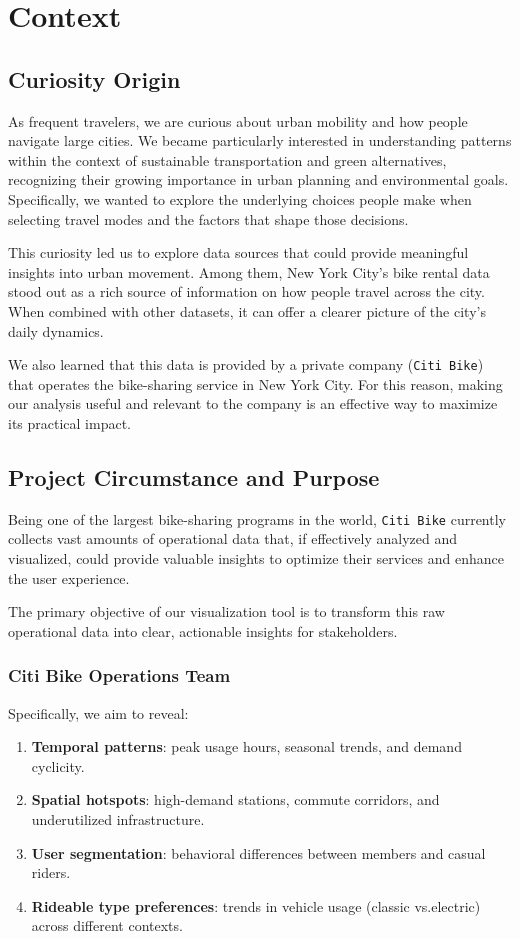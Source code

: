\section{Context}

\subsection{Curiosity Origin}
As frequent travelers, we are curious about urban mobility and how people navigate large cities.
We became particularly interested in understanding patterns within the context of sustainable transportation and green alternatives, recognizing their growing importance in urban planning and environmental goals.
Specifically, we wanted to explore the underlying choices people make when selecting travel modes and the factors that shape those decisions.

This curiosity led us to explore data sources that could provide meaningful insights into urban movement.
Among them, New York City's bike rental data stood out as a rich source of information on how people travel across the city.
When combined with other datasets, it can offer a clearer picture of the city's daily dynamics.

We also learned that this data is provided by a private company (\texttt{Citi Bike}) that operates the bike-sharing service in New York City.
For this reason, making our analysis useful and relevant to the company is an effective way to maximize its practical impact.

\subsection{Project Circumstance and Purpose}
Being one of the largest bike-sharing programs in the world, \texttt{Citi Bike} currently collects vast amounts of operational data that, if effectively analyzed and visualized, could provide valuable insights to optimize their services and enhance the user experience.

The primary objective of our visualization tool is to transform this raw operational data into clear, actionable insights for stakeholders.

\subsubsection{Citi Bike Operations Team}
Specifically, we aim to reveal:
\begin{enumerate}
  \item \textbf{Temporal patterns}: peak usage hours, seasonal trends, and demand cyclicity.
  \item \textbf{Spatial hotspots}: high-demand stations, commute corridors, and underutilized infrastructure.
  \item \textbf{User segmentation}: behavioral differences between members and casual riders.
  \item \textbf{Rideable type preferences}: trends in vehicle usage (classic vs.\@ electric) across different contexts.
\end{enumerate}

